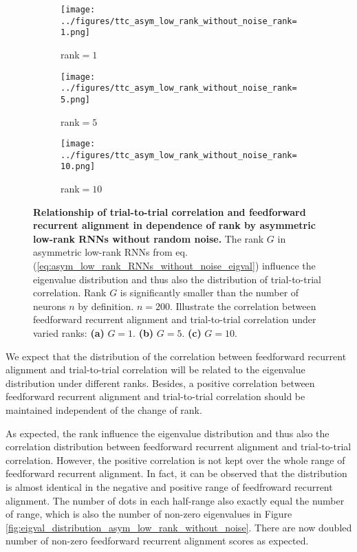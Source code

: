 \documentclass[11pt]{article}
\begin{document}
		\begin{figure}[H]
			\centering
			\begin{subfigure}[b]{0.3\textwidth}
				\texttt{[image: ../figures/ttc\_asym\_low\_rank\_without\_noise\_rank=1.png]}
				\caption{rank$=1$}
			\end{subfigure}
			\begin{subfigure}[b]{0.3\textwidth}
				\texttt{[image: ../figures/ttc\_asym\_low\_rank\_without\_noise\_rank=5.png]}
				\caption{rank$=5$}
			\end{subfigure}
			\begin{subfigure}[b]{0.3\textwidth}
				\texttt{[image: ../figures/ttc\_asym\_low\_rank\_without\_noise\_rank=10.png]}
				\caption{rank$=10$}
			\end{subfigure} 
			\caption[Relationship of trial-to-trial correlation and feedforward recurrent alignment in dependence of rank by asymmetric low-rank RNNs without random noise]{\textbf{Relationship of trial-to-trial correlation and feedforward recurrent alignment in dependence of rank by asymmetric low-rank RNNs without random noise.} The rank $G$ in asymmetric low-rank RNNs from eq.(\ref{eq:asym_low_rank_RNNs_without_noise_eigval}) influence the eigenvalue distribution and thus also the distribution of trial-to-trial correlation. Rank $G$ is significantly smaller than the number of neurons $n$ by definition. $n=200$. Illustrate the correlation between feedforward recurrent alignment and trial-to-trial correlation under varied ranks: \textbf{(a)} $G=1$. \textbf{(b)} $G=5$. \textbf{(c)} $G=10$.} 
			\label{fig:ttc_asym_low_rank_RNN_without_noise}
		\end{figure}
	We expect that the distribution of the correlation between feedforward recurrent alignment and trial-to-trial correlation will be related to the eigenvalue distribution under different ranks. Besides, a positive correlation between feedforward recurrent alignment and trial-to-trial correlation should be maintained independent of the change of rank.
	
	As expected, the rank influence the eigenvalue distribution and thus also the correlation distribution between feedforward recurrent alignment and trial-to-trial correlation. However, the positive correlation is not kept over the whole range of feedforward recurrent alignment. In fact, it can be observed that the distribution is almost identical in the negative and positive range of feedfroward recurrent alignment. The number of dots in each half-range also exactly equal the number of range, which is also the number of non-zero eigenvalues in Figure \ref{fig:eigval_distribution_asym_low_rank_without_noise}. There are now doubled number of non-zero feedforward recurrent alignment scores as expected. 
		
\end{document}
